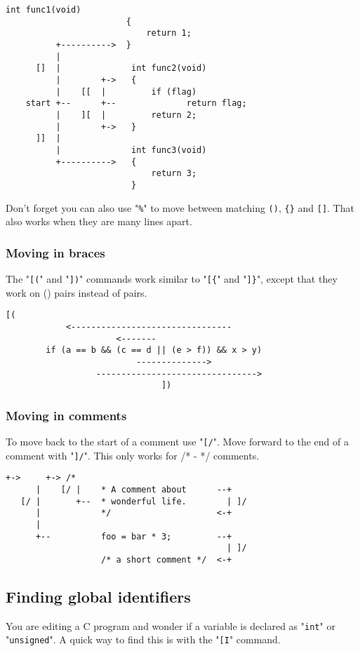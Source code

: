 \begin{Verbatim}[samepage=true]
                        int func1(void)
                        {
                            return 1;
          +---------->  }
          |
      []  |              int func2(void)
          |        +->   {
          |    [[  |         if (flag)
    start +--      +--              return flag;
          |    ][  |         return 2;
          |        +->   }
      ]]  |
          |              int func3(void)
          +---------->   {
                             return 3;
                         }
\end{Verbatim}

Don't forget you can also use "\verb!%!" to move between matching \verb!()!, \verb!{}! and \verb![]!.
That also works when they are many lines apart.
\subsubsection{Moving in braces}
The "\verb![(!" and "\verb!])!" commands work similar to "\verb![{!" and "\verb!]}!", except that they work on () pairs instead of {} pairs.

\begin{Verbatim}[samepage=true]
                          [(
            <--------------------------------
                      <-------
        if (a == b && (c == d || (e > f)) && x > y) 
                          -------------->
                  -------------------------------->
                               ])
\end{Verbatim}

\subsubsection{Moving in comments}
To move back to the start of a comment use "\verb![/!".
Move forward to the end of a comment with "\verb!]/!".
This only works for /* - */ comments.

\begin{Verbatim}[samepage=true]
      +->     +-> /*
      |    [/ |    * A comment about      --+
   [/ |       +--  * wonderful life.        | ]/
      |            */                     <-+
      |
      +--          foo = bar * 3;         --+
                                            | ]/
                   /* a short comment */  <-+
\end{Verbatim}
\subsection{Finding global identifiers}
You are editing a C program and wonder if a variable is declared as "\verb!int!" or "\verb!unsigned!".
A quick way to find this is with the "\verb![I!" command.

